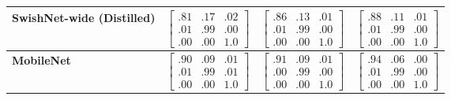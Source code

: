 \begin{table}
\begin{tabular}{M{5.4em}P{6.5em}P{6.5em}P{6.5em}}
		\midrule
		\textbf{SwishNet-wide (Distilled)} 
		& $\begin{bmatrix}
		.81 & .17 & .02\\
		.01 & .99 & .00\\
		.00 & .00 & 1.0
		\end{bmatrix}$ & 
		$\begin{bmatrix}
		.86 & .13 & .01\\
		.01 & .99 & .00\\
		.00 & .00 & 1.0
		\end{bmatrix}$ 
		& $\begin{bmatrix}
		.88 & .11 & .01\\
		.01 & .99 & .00\\
		.00 & .00 & 1.0
		\end{bmatrix}$ \\
		
		\midrule 
		\textbf{MobileNet} 
		& $\begin{bmatrix}
		.90 & .09 & .01\\
		.01 & .99 & .01\\
		.00 & .00 & 1.0
		\end{bmatrix}$ 
		& $\begin{bmatrix}
		.91 & .09 & .01\\
		.00 & .99 & .00\\
		.00 & .00 & 1.0
		\end{bmatrix}$ 
		& $\begin{bmatrix}
		.94 & .06 & .00\\
		.01 & .99 & .00\\
		.00 & .00 & 1.0
		\end{bmatrix}$ \\
		\bottomrule
	\end{tabular}
	\label{tab:conmat}%
\end{table}